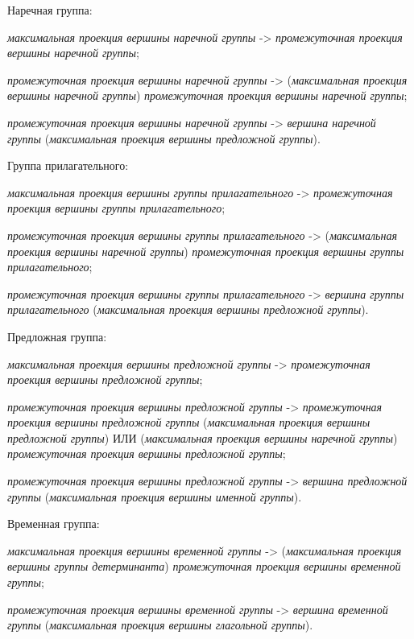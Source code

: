 Наречная группа:
\begin{textitemize}
    \item \textit{максимальная проекция вершины наречной группы} -> \textit{промежуточная проекция вершины наречной группы};
    \item \textit{промежуточная проекция вершины наречной группы} -> (\textit{максимальная проекция вершины наречной группы}) \textit{промежуточная проекция вершины наречной группы};
    \item \textit{промежуточная проекция вершины наречной группы} -> \textit{вершина наречной группы} (\textit{максимальная проекция вершины предложной группы}).
\end{textitemize}

Группа прилагательного:
\begin{textitemize}
    \item \textit{максимальная проекция вершины группы прилагательного} -> \textit{промежуточная проекция вершины группы прилагательного};
    \item \textit{промежуточная проекция вершины группы прилагательного} -> (\textit{максимальная проекция вершины наречной группы}) \textit{промежуточная проекция вершины группы прилагательного};
    \item \textit{промежуточная проекция вершины группы прилагательного} -> \textit{вершина группы прилагательного} (\textit{максимальная проекция вершины предложной группы}).
\end{textitemize}

Предложная группа:
\begin{textitemize}
    \item \textit{максимальная проекция вершины предложной группы} -> \textit{промежуточная проекция вершины предложной группы};
    \item \textit{промежуточная проекция вершины предложной группы} -> \textit{промежуточная проекция вершины предложной группы} (\textit{максимальная проекция вершины предложной группы}) ИЛИ (\textit{максимальная проекция вершины наречной группы}) \textit{промежуточная проекция вершины предложной группы};
    \item \textit{промежуточная проекция вершины предложной группы} -> \textit{вершина предложной группы} (\textit{максимальная проекция вершины именной группы}).
\end{textitemize}

Временная группа:
\begin{textitemize}
    \item \textit{максимальная проекция вершины временной группы} -> (\textit{максимальная проекция вершины группы детерминанта}) \textit{промежуточная проекция вершины временной группы};
    \item \textit{промежуточная проекция вершины временной группы} -> \textit{вершина временной группы} (\textit{максимальная проекция вершины глагольной группы}).
\end{textitemize}

